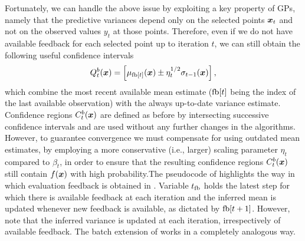 Fortunately, we can handle the above issue by exploiting a key property of GPs,
namely that
the predictive variances  depend only on the selected points
$\bm{x}_t$ and not on the observed values $y_t$ at those points. Therefore,
even if we do not
have available feedback for each selected point up to iteration $t$, we
can still obtain the following useful confidence intervals
\begin{align*}
Q_t^b(\bm{x}) = \left[\mu_{\mathop{\mathrm{fb}}[t]}(\bm{x}) \pm \eta_t^{1/2}\sigma_{t-1}(\bm{x})\right],
\end{align*}
which combine the most recent available mean estimate
($\mathop{\mathrm{fb}}[t]$ being the index of the last available observation)
with the always up-to-date variance estimate. Confidence regions $C_t^b(\bm{x})$ are
defined as before by intersecting successive confidence intervals and are
used without any further changes in the algorithms.
However, to guarantee convergence we must compensate for using outdated mean estimates,
by employing a more conservative
(i.e., larger) scaling parameter $\eta_t$ compared to $\beta_t$,
in order to ensure that the resulting confidence regions $C_t^b(\bm{x})$
still contain $f(\bm{x})$ with high probability.\footnotemark[2] 
The pseudocode of  highlights the way in which
evaluation feedback is obtained in \bacl. Variable $t_{\mathop{\mathrm{fb}}}$ holds the
latest step for which there is available feedback at each iteration and
the inferred mean is updated whenever new feedback is available, as
dictated by $\mathop{\mathrm{fb}}[t+1]$. However, note that the inferred variance is
updated at each iteration, irrespectively of available feedback.
The batch extension of \iacl works in a completely analogous way.

